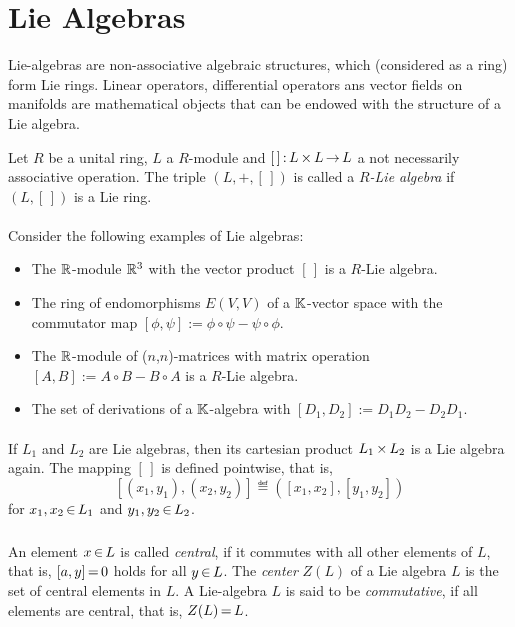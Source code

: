 \documentclass[11pt,twoside]{article}
\begin{document}
\section{Lie Algebras}
Lie-algebras are non-associative algebraic structures, 
which (considered as a ring) form Lie rings.
Linear operators, differential operators ans vector fields on
manifolds are mathematical objects
that can be endowed with the structure of a Lie algebra.

\begin{definition}
Let $R$ be a unital ring, $L$ a $R$-module and
$[\,] {\,:\,} L {\,\times\,} L {\,\to\,} L$ a not necessarily associative operation.
The triple $(L,+,[\,])$ is called a \textit{$R$-Lie algebra}
if $(L,[\,])$ is a Lie ring.
\end{definition}

\paragraph{}
Consider the following examples of Lie algebras:

\begin{itemize}[leftmargin=15pt]
\item[1.]
The ${\mathbb{R}}$-module ${\mathbb{R}}^3$ with the vector product $[\,]$ is a $R$-Lie algebra.
\item[2.]
The ring of endomorphisms $E(V,V)$ of a ${\mathbb{K}}$-vector space with the
commutator map $[\phi,\psi] := \phi \circ \psi - \psi \circ \phi$.
\item[3.]
The ${\mathbb{R}}$-module of ($n$,$n$)-matrices with matrix operation
$[A,B] := A \circ B - B \circ A$
is a $R$-Lie algebra.
\item[4.]
The set of derivations of a ${\mathbb{K}}$-algebra with $[D_1,D_2] := D_1D_2-D_2D_1$.
\end{itemize}

\paragraph{}
If $L_1$ and $L_2$ are Lie algebras,
then its cartesian product
$L_1 {\,\times\,} L_2$ is a Lie algebra again.
The mapping $[\,]$ is defined pointwise,
that is,
\[
[(x_1,y_1),(x_2,y_2)] \eqdef ([x_1,x_2], [y_1,y_2])
\]
for $x_1,x_2 {\,\in\,} L_1$ and $y_1,y_2 {\,\in\,} L_2$.

\subparagraph{}
An element $x {\,\in\,} L$ is called \textit{central},
if it commutes with all other elements of $L$,
that is,
$[a,y] {\,=\,} 0$ holds for all $y {\,\in\,} L$.
The \textit{center} $Z(L)$ of a Lie algebra $L$ is the set of central elements in $L$.
A Lie-algebra $L$ is said to be \textit{commutative},
if all elements are central,
that is,
$Z(L) {\,=\,} L$.
\end{document}
